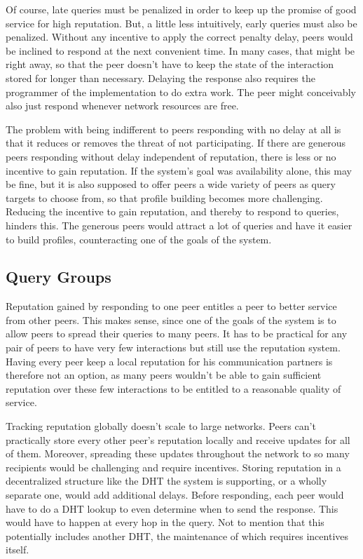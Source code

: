 Of course, late queries must be penalized in order to keep up the promise
of good service for high reputation. But, a little less intuitively, early
queries must also be penalized. Without any incentive to apply the correct
penalty delay, peers would be inclined to respond at the next convenient time.
In many cases, that might be right away, so that the peer doesn't have to keep
the state of the interaction stored for longer than necessary. Delaying the
response also requires the programmer of the implementation to do extra work.
The peer might conceivably also just respond whenever network resources are
free.

The problem with being indifferent to peers responding with no delay at all is
that it reduces or removes the threat of not participating. If there are
generous peers responding without delay independent of reputation, there is less
or no incentive to gain reputation. If the system's goal was availability alone,
this may be fine, but it is also supposed to offer peers a wide variety of peers
as query targets to choose from, so that profile building becomes more
challenging. Reducing the incentive to gain reputation, and thereby to respond
to queries, hinders this. The generous peers would attract a lot of queries and
have it easier to build profiles, counteracting one of the goals of the system.

\subsection{Query Groups}
Reputation gained by responding to one peer entitles a peer to better service
from other peers. This makes sense, since one of the goals of the system is to
allow peers to spread their queries to many peers. It has to be practical for
any pair of peers to have very few interactions but still use the reputation
system. Having every peer keep a local reputation for his communication partners
is therefore not an option, as many peers wouldn't be able to gain sufficient
reputation over these few interactions to be entitled to a reasonable quality of
service.

Tracking reputation globally doesn't scale to large networks. Peers can't
practically store every other peer's reputation locally and receive updates for
all of them. Moreover, spreading these updates throughout the network to so many
recipients would be challenging and require incentives. Storing reputation in a
decentralized structure like the \ac{DHT} the system is supporting, or a wholly
separate one, would add additional delays. Before responding, each peer would
have to do a \ac{DHT} lookup to even determine when to send the response. This
would have to happen at every hop in the query. Not to mention that this
potentially includes another \ac{DHT}, the maintenance of which requires
incentives itself.

